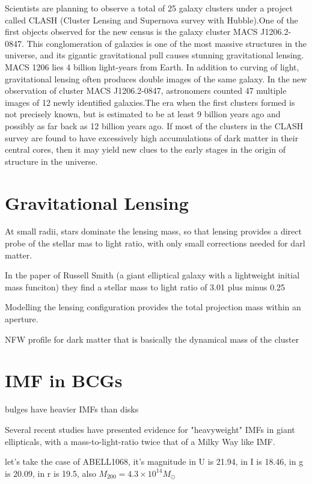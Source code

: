 Scientists are planning to observe a total of 25 galaxy clusters under a project called CLASH (Cluster Lensing and Supernova survey with Hubble).One of the first objects observed for the new census is the galaxy cluster MACS J1206.2-0847. This conglomeration of galaxies is one of the most massive structures in the universe, and its gigantic gravitational pull causes stunning gravitational lensing. MACS 1206 lies 4 billion light-years from Earth. In addition to curving of light, gravitational lensing often produces double images of the same galaxy. In the new observation of cluster MACS J1206.2-0847, astronomers counted 47 multiple images of 12 newly identified galaxies.The era when the first clusters formed is not precisely known, but is estimated to be at least 9 billion years ago and possibly as far back as 12 billion years ago. If most of the clusters in the CLASH survey are found to have excessively high accumulations of dark matter in their central cores, then it may yield new clues to the early stages in the origin of structure in the universe.


\section{Gravitational Lensing}

At small radii, stars dominate the lensing mass, so that lensing provides a direct probe of the stellar mas to light ratio, with only small corrections needed for darl matter.

In the paper of Russell Smith (a giant elliptical galaxy with a lightweight initial mass funciton) they find a stellar mass to light ratio of 3.01 plus minus 0.25

Modelling the lensing configuration provides the total projection mass within an aperture.

NFW profile for dark matter that is basically the dynamical mass of the cluster

\section{IMF in BCGs}

bulges have heavier IMFs than disks

Several recent studies have presented evidence for "heavyweight" IMFs in giant ellipticals, with a mass-to-light-ratio twice that of a Milky Way like IMF.

let's take the case of ABELL1068, it's magnitude in U is 21.94, in I is 18.46, in g is 20.09, in r is 19.5, also $M_{200}=4.3\times 10^{14}M_{\odot}$

